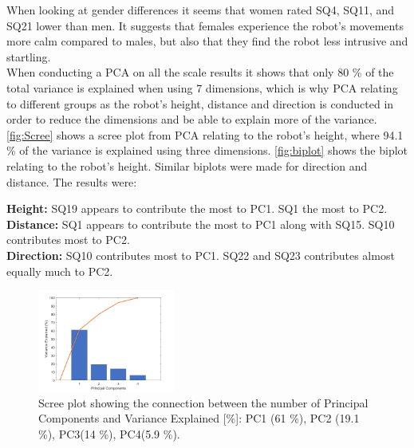\noindent
When looking at gender differences it seems that women rated SQ4, SQ11, and SQ21 lower than men. It suggests that females experience the robot's movements more calm compared to males, but also that they find the robot less intrusive and startling.\\

\noindent
When conducting a PCA on all the scale results it shows that only 80 \% of the total variance is explained when using 7 dimensions, which is why PCA relating to different groups as the robot's height, distance and direction is conducted in order to reduce the dimensions and be able to explain more of the variance. \autoref{fig:Scree} shows a scree plot from PCA relating to the robot's height, where 94.1 \% of the variance is explained using three dimensions. \autoref{fig:biplot} shows the biplot relating to the robot's height. Similar biplots were made for direction and distance. The results were:

\noindent
\textbullet \textbf{Height:} SQ19 appears to contribute the most to PC1. SQ1 the most to PC2. \\
\textbullet \textbf{Distance:} SQ1 appears to contribute the most to PC1 along with SQ15. SQ10 contributes most to PC2.\\
\textbullet \textbf{Direction:} SQ10 contributes most to PC1. SQ22 and SQ23 contributes almost equally much to PC2.\\
%
\begin{figure}
	\centering
	\includegraphics[width = 0.40\textwidth]{Figure/Scree.png}
	\caption{Scree plot showing the connection between the number of Principal Components and Variance Explained [\%]: PC1 (61 \%), PC2 (19.1 \%), PC3(14 \%), PC4(5.9 \%).}
	\label{fig:Scree}
\end{figure}
\noindent

